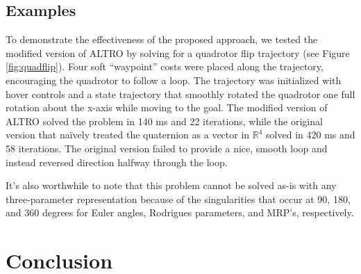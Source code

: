 \documentclass[letterpaper, 10 pt, conference]{ieeeconf}  %
\newcommand{\R}{\mathbb{R}}
\newcommand{\todo}[1]{\textcolor{red}{TODO: #1}}
\begin{document}
    \subsection{Examples}
        To demonstrate the effectiveness of the proposed approach, we tested the modified
        version of ALTRO by solving for a quadrotor flip trajectory (see Figure \ref{fig:quadflip}).
        Four soft ``waypoint'' costs were placed along the trajectory, encouraging the
        quadrotor to follow a loop. The trajectory was initialized with hover controls and a
        state trajectory that smoothly rotated the quadrotor one full rotation about the 
        x-axis while moving to the goal. 
        The modified version of ALTRO solved the problem in 140 ms and 22 iterations, while
        the original version that na\"ively treated the quaternion as a vector in $\R^4$ 
        solved in 420 ms and 58 iterations. The original version failed to provide a nice,
        smooth loop and instead reversed direction halfway through the loop.

        It's also worthwhile to note that this problem cannot be solved as-is with any
        three-parameter representation because of the singularities that occur at 90, 180,
        and 360 degrees for Euler angles, Rodrigues parameters, and MRP's, respectively.
        

\section{Conclusion} 
\end{document}
